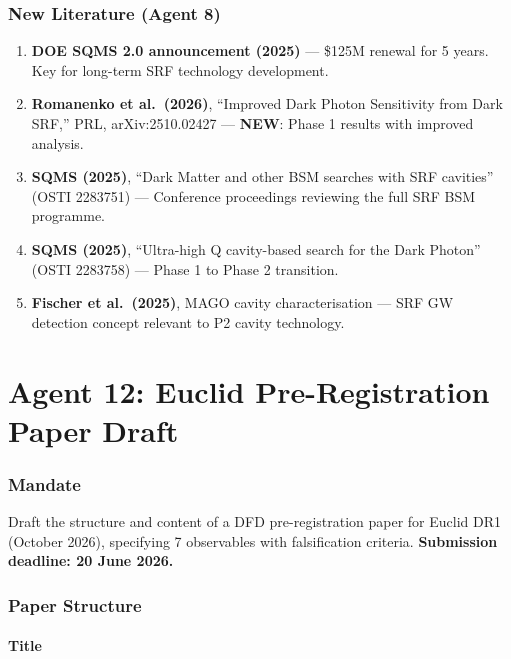 \documentclass[11pt,a4paper]{article}
\newcommand{\NEW}{\textcolor{dfdblue}{\textbf{NEW}}}
\begin{document}
\section{New Literature (Agent 8)}

\begin{enumerate}
\item \textbf{DOE SQMS 2.0 announcement (2025)} --- \$125M renewal for 5 years. Key for long-term SRF technology development.

\item \textbf{Romanenko et al.\ (2026)}, ``Improved Dark Photon Sensitivity from Dark SRF,'' PRL, arXiv:2510.02427 --- \NEW: Phase 1 results with improved analysis.

\item \textbf{SQMS (2025)}, ``Dark Matter and other BSM searches with SRF cavities'' (OSTI 2283751) --- Conference proceedings reviewing the full SRF BSM programme.

\item \textbf{SQMS (2025)}, ``Ultra-high Q cavity-based search for the Dark Photon'' (OSTI 2283758) --- Phase 1 to Phase 2 transition.

\item \textbf{Fischer et al.\ (2025)}, MAGO cavity characterisation --- SRF GW detection concept relevant to P2 cavity technology.
\end{enumerate}


\part{Agent 12: Euclid Pre-Registration Paper Draft}
\label{part:agent12}

\section{Mandate}

Draft the structure and content of a DFD pre-registration paper for Euclid DR1 (October 2026), specifying 7 observables with falsification criteria. \textbf{Submission deadline: 20 June 2026.}

\section{Paper Structure}

\subsection{Title}
\end{document}
